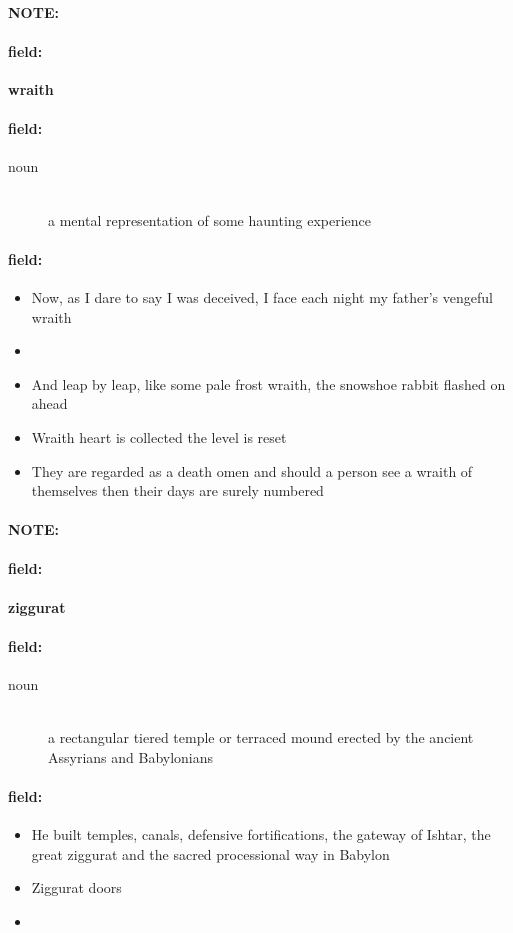 \documentclass[12pt]{article}
\newenvironment{note}{\paragraph{NOTE:}}{}
\newenvironment{field}{\paragraph{field:}}{}
\begin{document}
\begin{note}
\begin{field}
\textbf{\large wraith}
\end{field}


\begin{field}
\begin{description}
\item[noun] \hfill \\ 
a mental representation of some haunting experience

\end{description}
\end{field}

\begin{field}
\begin{itemize}
\item Now, as I dare to say I was deceived, I face each night my father's vengeful wraith
\item 
\item And leap by leap, like some pale frost wraith, the snowshoe rabbit flashed on ahead
\item Wraith heart is collected the level is reset
\item They are regarded as a death omen and should a person see a wraith of themselves then their days are surely numbered
\end{itemize}
\end{field}
\end{note}
\begin{note}
\begin{field}
\textbf{\large ziggurat}
\end{field}


\begin{field}
\begin{description}
\item[noun] \hfill \\ 
a rectangular tiered temple or terraced mound erected by the ancient Assyrians and Babylonians

\end{description}
\end{field}

\begin{field}
\begin{itemize}
\item He built temples, canals, defensive fortifications, the gateway of Ishtar, the great ziggurat and the sacred processional way in Babylon
\item Ziggurat doors
\item 
\end{itemize}
\end{field}
\end{note}
\end{document}
